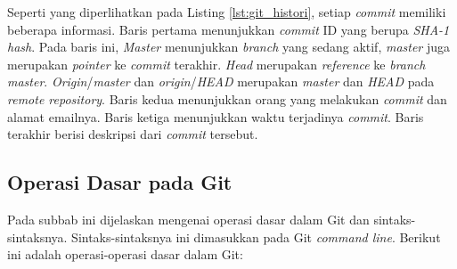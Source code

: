 Seperti yang diperlihatkan pada Listing \ref{lst:git_histori}, setiap \textit{commit} memiliki beberapa informasi. Baris pertama menunjukkan \textit{commit} ID yang berupa \textit{SHA-1 hash}. Pada baris ini, \textit{Master} menunjukkan \textit{branch} yang sedang aktif, \textit{master} juga merupakan \textit{pointer} ke \textit{commit} terakhir. \textit{Head} merupakan \textit{reference} ke \textit{branch master}. \textit{Origin}/\textit{master} dan \textit{origin}/\textit{HEAD} merupakan \textit{master} dan \textit{HEAD} pada \textit{remote repository}. Baris kedua menunjukkan orang yang melakukan \textit{commit} dan alamat emailnya. Baris ketiga menunjukkan waktu terjadinya \textit{commit}. Baris terakhir berisi deskripsi dari \textit{commit} tersebut.

\subsection{Operasi Dasar pada Git}
\label{subsec:operasi_dasar_git}
Pada subbab ini dijelaskan mengenai operasi dasar dalam Git dan sintaks-sintaksnya. Sintaks-sintaksnya ini dimasukkan pada Git \textit{command line}. Berikut ini adalah operasi-operasi dasar dalam Git:

